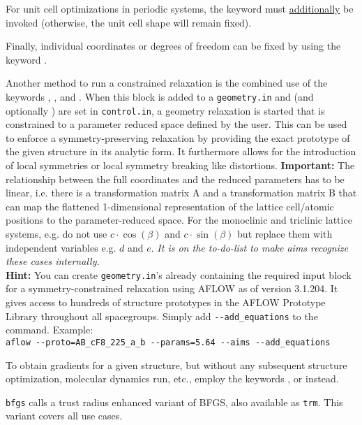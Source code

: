 For unit cell optimizations in periodic systems, the keyword
 must \underline{additionally} be invoked
(otherwise, the unit cell shape will remain fixed).

Finally, individual coordinates or degrees of freedom can be fixed by
using the keyword . 

Another method to run a constrained relaxation is the combined use of the keywords
, , 
and . When this block is added to a \texttt{geometry.in} and 
 (and optionally ) are set in \texttt{control.in}, a geometry
relaxation is started that is constrained to a parameter reduced space defined by the user.
This can be used to enforce a symmetry-preserving relaxation by providing the exact prototype
of the given structure in its analytic form. It furthermore allows for the introduction of local
symmetries or local symmetry breaking like distortions.
{\bf Important:} The relationship between the full coordinates and the reduced parameters has to be 
linear, i.e. there is a transformation matrix A and a transformation matrix B that can map the
flattened 1-dimensional representation of the lattice cell/atomic positions to the parameter-reduced space.
For the monoclinic and triclinic lattice systems, e.g. do not use $c\cdot \cos(\beta)$ and $c\cdot \sin(\beta)$
but replace them with independent variables e.g. $d$ and $e$. {\em It is on the to-do-list to make aims 
recognize these cases internally.}\\
{\bf Hint:} You can create \texttt{geometry.in}'s already containing the required input block for a symmetry-constrained relaxation using AFLOW as of version 3.1.204. It gives access to hundreds of structure prototypes in the AFLOW Prototype Library \cite{Mehl2017,Hicks2018} throughout all spacegroups. Simply add \texttt{-{}-add\_equations} to the command. 
Example: \\
\texttt{aflow -{}-proto=AB\_cF8\_225\_a\_b -{}-params=5.64 -{}-aims -{}-add\_equations}

To obtain gradients for a given structure, but without any subsequent
structure optimization, molecular dynamics run, etc., employ the keywords
,  or 
 instead.

 \texttt{bfgs}
 calls a trust radius enhanced variant of BFGS, also
available as \texttt{trm}. This variant covers all use cases.


